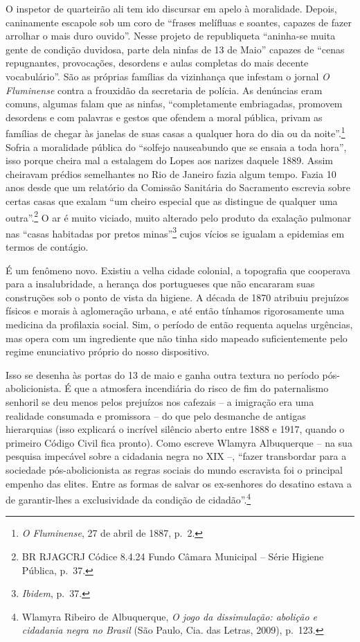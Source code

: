 O inspetor de quarteirão ali tem ido discursar em apelo à moralidade.
Depois, caninamente escapole sob um coro de ``frases melífluas e
soantes, capazes de fazer arrolhar o mais duro ouvido''. Nesse projeto
de republiqueta ``aninha-se muita gente de condição duvidosa, parte dela
ninfas de 13 de Maio'' capazes de ``cenas repugnantes, provocações,
desordens e aulas completas do mais decente vocabulário''. São as
próprias famílias da vizinhança que infestam o jornal \emph{O
Fluminense} contra a frouxidão da secretaria de polícia. As denúncias
eram comuns, algumas falam que as ninfas, ``completamente embriagadas,
promovem desordens e com palavras e gestos que ofendem a moral pública,
privam as famílias de chegar às janelas de suas casas a qualquer hora do
dia ou da noite''.\footnote{\emph{O Fluminense}, 27 de abril de 1887,
  p.~2.} Sofria a moralidade pública do ``solfejo nauseabundo que se
ensaia a toda hora'', isso porque cheira mal a estalagem do Lopes aos
narizes daquele 1889. Assim cheiravam prédios semelhantes no Rio de
Janeiro fazia algum tempo. Fazia 10 anos desde que um relatório da
Comissão Sanitária do Sacramento escrevia sobre certas casas que exalam
``um cheiro especial que as distingue de qualquer uma outra''.\footnote{BR
  RJAGCRJ Códice 8.4.24 Fundo Câmara Municipal -- Série Higiene Pública,
  p.~37.} O ar é muito viciado, muito alterado pelo produto da exalação
pulmonar nas ``casas habitadas por pretos minas''\footnote{\emph{Ibidem},
  p.~37.} cujos vícios se igualam a epidemias em termos de contágio.

É um fenômeno novo. Existiu a velha cidade colonial, a topografia que
cooperava para a insalubridade, a herança dos portugueses que não
encararam suas construções sob o ponto de vista da higiene. A década de
1870 atribuiu prejuízos físicos e morais à aglomeração urbana, e até
então tínhamos rigorosamente uma medicina da profilaxia social. Sim, o
período de então requenta aquelas urgências, mas opera com um
ingrediente que não tinha sido mapeado suficientemente pelo regime
enunciativo próprio do nosso dispositivo.

Isso se desenha às portas do 13 de maio e ganha outra textura no período
pós-abolicionista. É que a atmosfera incendiária do risco de fim do
paternalismo senhoril se deu menos pelos prejuízos nos cafezais -- a
imigração era uma realidade consumada e promissora -- do que pelo
desmanche de antigas hierarquias (isso explicará o incrível silêncio
aberto entre 1888 e 1917, quando o primeiro Código Civil fica pronto).
Como escreve Wlamyra Albuquerque -- na sua pesquisa impecável sobre a
cidadania negra no XIX --, ``fazer transbordar para a sociedade
pós-abolicionista as regras sociais do mundo escravista foi o principal
empenho das elites. Entre as formas de salvar os ex-senhores do desatino
estava a de garantir-lhes a exclusividade da condição de
cidadão''.\footnote{Wlamyra Ribeiro de Albuquerque, \emph{O jogo da
  dissimulação: abolição e cidadania negra no Brasil} (São Paulo, Cia.
  das Letras, 2009), p.~123.}

